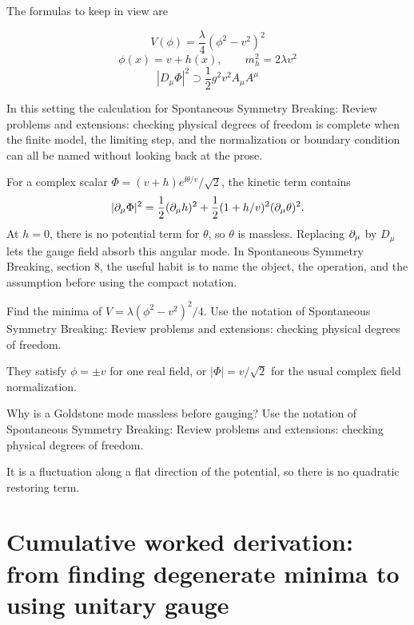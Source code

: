 The formulas to keep in view are

\[
  V(\phi)=\frac{\lambda}{4}(\phi^2-v^2)^2
\]
\[
  \phi(x)=v+h(x),\qquad m_h^2=2\lambda v^2
\]
\[
  |D_\mu\Phi|^2\supset \frac12g^2v^2A_\mu A^\mu
\]

In this setting the calculation for Spontaneous Symmetry Breaking: Review problems and extensions: checking physical degrees of freedom is complete when the finite model, the limiting step, and the normalization or boundary condition can all be named without looking back at the prose.




\begin{example}
For a complex scalar \(\Phi=(v+h)e^{\ii\theta/v}/\sqrt2\), the kinetic term contains
\[
  |\partial_\mu\Phi|^2=\frac12(\partial_\mu h)^2+\frac12(1+h/v)^2(\partial_\mu\theta)^2.
\]
At \(h=0\), there is no potential term for \(\theta\), so \(\theta\) is massless.  Replacing \(\partial_\mu\) by \(D_\mu\) lets the gauge field absorb this angular mode.  In Spontaneous Symmetry Breaking, section 8, the useful habit is to name the object, the operation, and the assumption before using the compact notation.
\end{example}



\begin{exercise}
Find the minima of \(V=\lambda(\phi^2-v^2)^2/4\).  Use the notation of Spontaneous Symmetry Breaking: Review problems and extensions: checking physical degrees of freedom.
\begin{answer}
They satisfy \(\phi=\pm v\) for one real field, or \(|\Phi|=v/\sqrt2\) for the usual complex field normalization.
\end{answer}
\end{exercise}

\begin{exercise}
Why is a Goldstone mode massless before gauging?  Use the notation of Spontaneous Symmetry Breaking: Review problems and extensions: checking physical degrees of freedom.
\begin{answer}
It is a fluctuation along a flat direction of the potential, so there is no quadratic restoring term.
\end{answer}
\end{exercise}



\section{Cumulative worked derivation: from finding degenerate minima to using unitary gauge}

